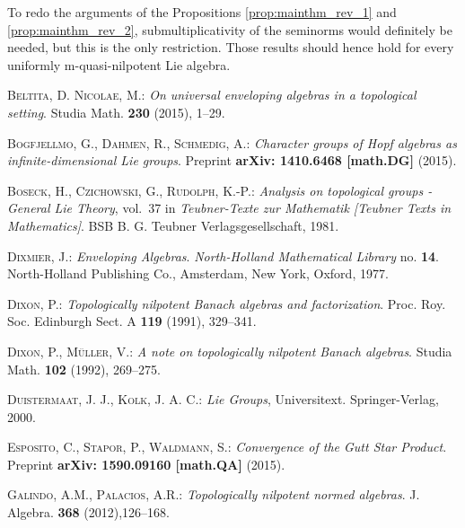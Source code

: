 \documentclass[
11pt,                          %
english                        %
]{article}
\begin{document}
To redo the arguments of the Propositions \ref{prop:mainthm_rev_1} and 
\ref{prop:mainthm_rev_2}, submultiplicativity of the seminorms would definitely be 
needed, but this is the only restriction. Those results should hence hold for every 
uniformly m-quasi-nilpotent Lie algebra.



\begin{thebibliography}{1}

\footnotesize
{}
\textsc{Beltita, D. Nicolae, M.: }\newblock \emph{On universal enveloping algebras in 
  a topological setting}.
\newblock Studia Math. \textbf{230} (2015), 1--29.

\textsc{Bogfjellmo, G., Dahmen, R., Schmedig, A.: }\newblock \emph{Character
  groups of Hopf algebras as infinite-dimensional Lie groups}.
\newblock Preprint  \textbf{arXiv: 1410.6468 [math.DG]} (2015).

\textsc{Boseck, H., Czichowski, G., Rudolph, K.-P.: }\newblock \emph{Analysis
  on topological groups - General Lie Theory}, vol.~37 in \emph{Teubner-Texte
  zur Mathematik [Teubner Texts in Mathematics]}.
\newblock BSB B. G. Teubner Verlagsgesellschaft, 1981.

\textsc{Dixmier, J.: }\newblock \emph{Enveloping Algebras}.
\newblock \emph{North-Holland Mathematical Library} no. \textbf{14}.
\newblock North-Holland Publishing Co., Amsterdam, New York, Oxford, 1977.

\textsc{Dixon, P.: }\newblock \emph{Topologically nilpotent Banach algebras and 
factorization}.
\newblock Proc. Roy. Soc. Edinburgh Sect. A \textbf{119} (1991), 329--341.

\textsc{Dixon, P., M\"uller, V.: }\newblock \emph{A note on topologically 
nilpotent Banach algebras}.
\newblock Studia Math. \textbf{102} (1992), 269--275.

\textsc{Duistermaat, J. J., Kolk, J. A. C.: }\newblock \emph{Lie Groups}, Universitext.
\newblock Springer-Verlag, 2000.

\textsc{Esposito, C., Stapor, P., Waldmann, S.: }\newblock \emph{Convergence 
  of the Gutt Star Product}.
\newblock Preprint  \textbf{arXiv: 1590.09160 [math.QA]} (2015).

\textsc{Galindo, A.M., Palacios, A.R.: }\newblock \emph{Topologically nilpotent 
normed algebras}.
\newblock J. Algebra.  \textbf{368} (2012),126--168.


\end{thebibliography}
\end{document}
